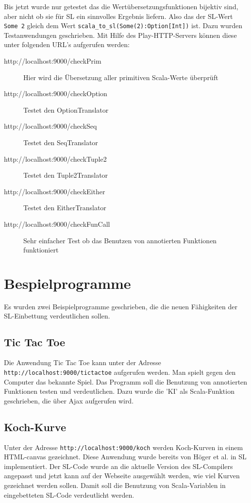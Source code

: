 \documentclass[12pt,bibtotoc]{scrreprt}
\begin{document}
Bis jetzt wurde nur getestet das die Wertübersetzungsfunktionen bijektiv sind, aber nicht ob sie für SL ein sinnvolles Ergebnis liefern. Also das der SL-Wert \lstinline!Some 2! gleich dem Wert \lstinline!scala_to_sl(Some(2):Option[Int])! ist. Dazu wurden Testanwendungen geschrieben. Mit Hilfe des Play-HTTP-Servers können diese unter folgenden URL's aufgerufen werden:

\begin{description}
 \item[http://localhost:9000/checkPrim] Hier wird die Übersetzung aller primitiven Scala-Werte überprüft
 \item[http://localhost:9000/checkOption] Testet den OptionTranslator
 \item[http://localhost:9000/checkSeq] Testet den SeqTranslator
 \item[http://localhost:9000/checkTuple2] Testet den Tuple2Translator
 \item[http://localhost:9000/checkEither] Testet den EitherTranslator
 \item[http://localhost:9000/checkFunCall] Sehr einfacher Test ob das Benutzen von annotierten Funktionen funktioniert
\end{description}

\section{Bespielprogramme}

Es wurden zwei Beispielprogramme geschrieben, die die neuen Fähigkeiten der SL-Einbettung verdeutlichen sollen.

\subsection{Tic Tac Toe}

Die Anwendung Tic Tac Toe kann unter der Adresse \lstinline!http://localhost:9000/tictactoe! aufgerufen werden. Man spielt gegen den Computer das bekannte Spiel. Das Programm soll die Benutzung von annotierten Funktionen testen und verdeutlichen. Dazu wurde die 'KI' als Scala-Funktion geschrieben, die über Ajax aufgerufen wird.

\subsection{Koch-Kurve}
\label{subsec:koch-curve}

Unter der Adresse \lstinline!http://localhost:9000/koch! werden Koch-Kurven in einem HTML-canvas gezeichnet. Diese Anwendung wurde bereits von Höger et al. in SL implementiert\cite{Hoger2013}. Der SL-Code wurde an die aktuelle Version des SL-Compilers angepasst und jetzt kann auf der Webseite ausgewählt werden, wie viel Kurven gezeichnet werden sollen. Damit soll die Benutzung von Scala-Variablen in eingebetteten SL-Code verdeutlicht werden.


{}

\end{document}
